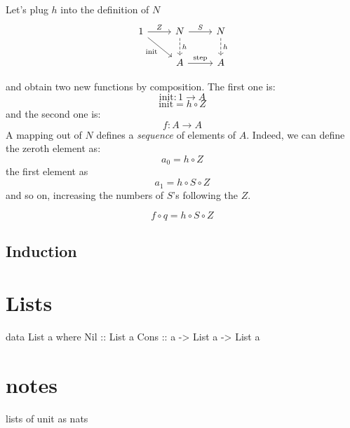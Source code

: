 \documentclass[DaoFP]{subfiles}
\begin{document}
Let's plug $h$ into the definition of $N$
\[
 \begin{tikzcd}
 1
 \arrow[r, "Z"]
 \arrow[rd, "\text{init}"']
 &N
  \arrow[r, "S"]
\arrow[d, dashed, "h"]
&N
\arrow[d, dashed, "h"]
\\
& A
\arrow[r, "\text{step}"]
& A
  \end{tikzcd}
\]

and obtain two new functions by composition. The first one is:
\[\text{init} \colon 1 \to A \]
\[\text{init} = h \circ Z \]
and the second one is:
\[f \colon A \to A \]
A mapping out of $N$ defines a \emph{sequence} of elements of $A$. Indeed, we can define the zeroth element as:
\[a_0 = h \circ Z \]
the first element as
\[a_1 = h \circ S \circ Z \]
and so on, increasing the numbers of $S$'s following the $Z$.

\[f \circ q = h \circ S \circ Z \]

\subsection{Induction}

\section{Lists}

\begin{haskell}
data List a where
  Nil :: List a
  Cons :: a -> List a -> List a
\end{haskell}


\section{notes}

lists of unit as nats

\begin{exercise}
\end{exercise}
\begin{haskell}
\end{haskell}
\end{document}
